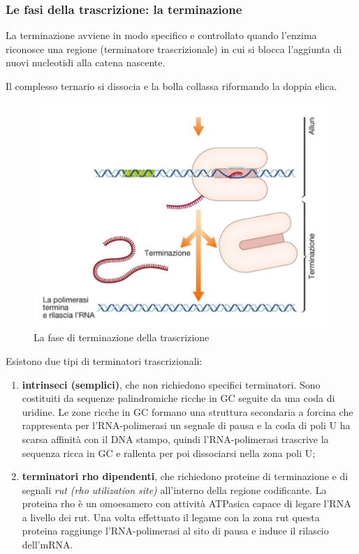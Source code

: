 \documentclass[11pt]{book}
\begin{document}
\clearpage
\subsubsection{Le fasi della trascrizione: la terminazione}
La terminazione avviene in modo specifico e controllato quando l’enzima riconosce una regione (terminatore trascrizionale) in cui si blocca l’aggiunta di nuovi nucleotidi alla catena nascente.

Il complesso ternario si dissocia e la bolla collassa riformando la doppia elica.

\begin{figure}[htp]
\centering
\includegraphics[scale=0.5]{img/Terminazione trascrizione.png}
\caption{La fase di terminazione della trascrizione}
\label{}
\end{figure}

Esistono due tipi di terminatori trascrizionali: 
\begin{enumerate}
\item \textbf{intrinseci (semplici)}, che non richiedono specifici terminatori. Sono costituiti da sequenze palindromiche ricche in GC seguite da una coda di uridine. Le zone ricche in GC formano una struttura secondaria a forcina che rappresenta per l’RNA-polimerasi un segnale di pausa e la coda di poli U ha scarsa affinità con il DNA stampo, quindi l’RNA-polimerasi trascrive la sequenza ricca in GC e rallenta per poi dissociarsi nella zona poli U;
\item \textbf{terminatori rho dipendenti}, che richiedono proteine di terminazione e di segnali \emph{rut (rho utilization site)} all’interno della regione codificante. La proteina rho è un omoesamero con attività ATPasica capace di legare l’RNA a livello dei rut. Una volta effettuato il legame con la zona rut questa proteina raggiunge l’RNA-polimerasi al sito di pausa e induce il rilascio dell’mRNA.
\end{enumerate}
\end{document}
